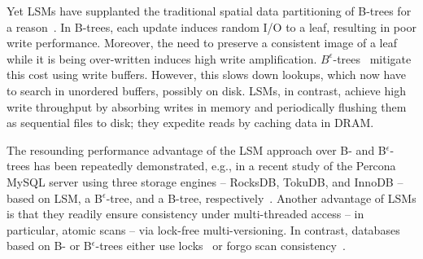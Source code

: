 Yet  LSMs have supplanted the  traditional spatial data partitioning of B-trees for a reason~\cite{rocks-vs-inno}.
In  B-trees, each update induces random I/O  to a leaf, resulting in poor write performance.
Moreover, the need to preserve a consistent image of a leaf while it is being over-written induces high write amplification. 
$B^{\epsilon}$-trees~\cite{Brodal:2003:LBE:644108.644201} mitigate this cost using write buffers. %
However, this slows down lookups, which now have to search in unordered buffers, possibly on disk. 
%
LSMs, in contrast, achieve high write throughput by absorbing  writes in memory and periodically flushing them as 
sequential files to disk; they expedite reads by caching data in DRAM.

The resounding performance advantage of the LSM approach over B- and B$^{\epsilon}$-trees has been repeatedly demonstrated, 
e.g., in a recent  study of the Percona MySQL server using three storage engines -- RocksDB, TokuDB, and InnoDB --
based on LSM, a B$^{\epsilon}$-tree, and a B-tree, respectively~\cite{toku-rocks-inno}.
%
Another advantage of LSMs is that they readily ensure consistency under multi-threaded access -- in particular, atomic scans --   
via lock-free multi-versioning.
In contrast, databases based on B- or  B$^\epsilon$-trees either use locks~\cite{innodblocking} 
or forgo scan consistency~\cite{tucana}.



 

